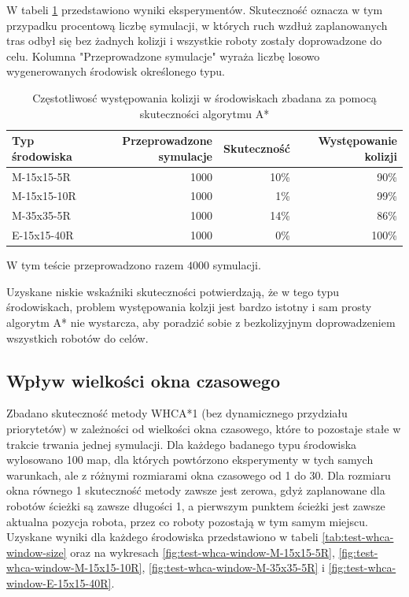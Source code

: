 W tabeli \ref{tab:test-collision-frequency} przedstawiono wyniki eksperymentów. Skuteczność oznacza w tym przypadku procentową liczbę symulacji, w których ruch wzdłuż zaplanowanych tras odbył się bez żadnych kolizji i wszystkie roboty zostały doprowadzone do celu.
Kolumna "Przeprowadzone symulacje" wyraża liczbę losowo wygenerowanych środowisk określonego typu.

\begin{table}
\caption{Częstotliwosć występowania kolizji w środowiskach zbadana za pomocą skuteczności algorytmu A*}
\label{tab:test-collision-frequency}
\centering
\begin{tabular}{| l | r | r | r |}
\hline
{\bf Typ środowiska} & {\bf Przeprowadzone symulacje} & {\bf Skuteczność} & {\bf Występowanie kolizji} \\ \hline
M-15x15-5R  & 1000 & 10\% & 90\% \\ \hline
M-15x15-10R & 1000 & 1\%  & 99\%  \\ \hline
M-35x35-5R  & 1000 & 14\% & 86\% \\ \hline
E-15x15-40R & 1000 & 0\%  & 100\%  \\ \hline
\end{tabular}
\end{table}

W tym teście przeprowadzono razem $4000$ symulacji.

Uzyskane niskie wskaźniki skuteczności potwierdzają, że w tego typu środowiskach, problem występowania kolzji jest bardzo istotny i sam prosty algorytm A* nie wystarcza, aby poradzić sobie z bezkolizyjnym doprowadzeniem wszystkich robotów do celów.

\subsection{Wpływ wielkości okna czasowego} %
Zbadano skuteczność metody WHCA*1 (bez dynamicznego przydziału priorytetów) w zależności od wielkości okna czasowego, które to pozostaje stałe w trakcie trwania jednej symulacji.
Dla każdego badanego typu środowiska wylosowano 100 map, dla których powtórzono eksperymenty w tych samych warunkach, ale z różnymi rozmiarami okna czasowego od 1 do 30.
Dla rozmiaru okna równego 1 skuteczność metody zawsze jest zerowa, gdyż zaplanowane dla robotów ścieżki są zawsze długości 1, a pierwszym punktem ścieżki jest zawsze aktualna pozycja robota, przez co roboty pozostają w tym samym miejscu.
Uzyskane wyniki dla każdego środowiska przedstawiono w tabeli \ref{tab:test-whca-window-size} oraz na wykresach \ref{fig:test-whca-window-M-15x15-5R}, \ref{fig:test-whca-window-M-15x15-10R}, \ref{fig:test-whca-window-M-35x35-5R} i \ref{fig:test-whca-window-E-15x15-40R}.

